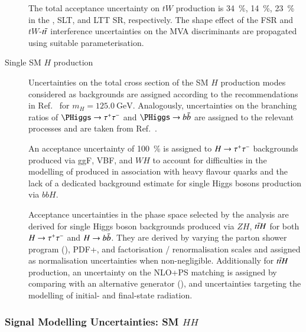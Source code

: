 \begin{description}
  The total acceptance uncertainty on $tW$ production is \SI{34}{\percent},
  \SI{14}{\percent}, \SI{23}{\percent} in the \hadhad, \lephad SLT, and \lephad
  LTT SR, respectively. The shape effect of the FSR and $tW$-$t\bar{t}$
  interference uncertainties on the MVA discriminants are propagated using
  suitable parameterisation.

\item[Single SM $H$ production] Uncertainties on the total cross section of the
  SM $H$ production modes considered as backgrounds are assigned according to
  the recommendations in Ref.~\cite{deFlorian:2016spz} for
  $m_{H} = \SI{125.0}{\GeV}$. Analogously, uncertainties on the branching ratios
  of $\PHiggs \to \tautau$ and $\PHiggs \to \bbbar$ are assigned to the relevant
  processes and are taken from Ref.~\cite{deFlorian:2016spz}.

  An acceptance uncertainty of \SI{100}{\percent} is assigned to $H \to \tau^{+} \tau^{-}$
  backgrounds produced via ggF, VBF, and $WH$ to account for difficulties in the
  modelling of produced in association with heavy flavour quarks
  and the lack of a dedicated background estimate for single Higgs bosons
  production via $bbH$.

  Acceptance uncertainties in the phase space selected by the analysis are
  derived for single Higgs boson backgrounds produced via $ZH$, $t\bar{t} H$ for
  both $H \to \tau^{+} \tau^{-}$ and $H \to b\bar{b}$. They are derived by varying the
  parton shower program (\HERWIG[7]), PDF+\alphas, and factorisation /
  renormalisation scales and assigned as normalisation uncertainties when
  non-negligible. Additionally for $t\bar{t} H$ production, an uncertainty on the
  NLO+PS matching is assigned by comparing with an alternative generator
  (\MGNLO[v2.6.0]), and uncertainties targeting the modelling of initial- and
  final-state radiation.
\end{description}





\subsubsection{Signal Modelling Uncertainties: SM $HH$}

